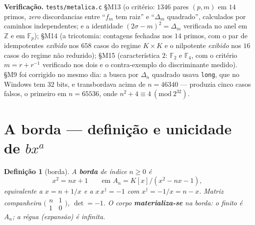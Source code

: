 \documentclass[11pt,a4paper]{article}
\newtheorem{definicao}{Definição}
\newcommand{\code}[1]{\texttt{#1}}
\begin{document}
\noindent\textbf{Verificação.} \code{tests/metalica.c} §M13 (o critério: $1346$ pares
$(p,m)$ em $14$ primos, \emph{zero} discordancias entre ``$f_m$ tem raiz'' e
``$\Delta_m$ quadrado'', calculados por caminhos independentes; e a identidade
$(2\sigma-m)^{2}=\Delta_m$ verificada no anel em $\mathbb{Z}$ e em $\mathbb{F}_p$);
§M14 (a tricotomia: contagens fechadas nos $14$ primos, com o par de idempotentes
\emph{exibido} nos $658$ casos do regime $K\times K$ e o nilpotente \emph{exibido} nos
$16$ casos do regime não reduzido); §M15 (característica $2$: $\mathbb{F}_2$ e
$\mathbb{F}_4$, com o critério $m=r+r^{-1}$ verificado nos dois e o contra-exemplo do
discriminante medido). §M9 foi corrigido no mesmo dia: a busca por $\Delta_n$ quadrado
usava \code{long}, que no Windows tem $32$ bits, e transbordava acima de $n=46340$ ---
produzia cinco casos falsos, o primeiro em $n=65536$, onde
$n^{2}+4\equiv4\ (\mathrm{mod}\ 2^{32})$.


\section{A borda --- definição e unicidade de $bx^{a}$}

\begin{definicao}[borda]\label{def:borda}
A \textbf{borda} de índice $n\geq0$ é
\[
x^{2}=nx+1
\qquad\text{em }A_n=K[x]/(x^{2}-nx-1),
\]
equivalente a $x=n+1/x$ e a $x\,x^{\dagger}=-1$ com
$x^{\dagger}=-1/x=n-x$. Matriz companheira
$\bigl(\begin{smallmatrix}n&1\\1&0\end{smallmatrix}\bigr)$, $\det=-1$.
O corpo \textbf{materializa-se} na borda: o finito é $A_n$; a régua
(expansão) é infinita.
\end{definicao}
\end{document}
